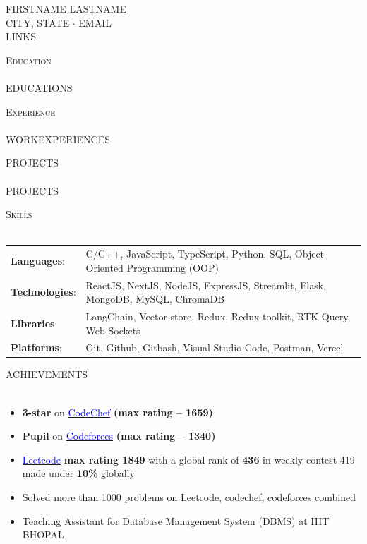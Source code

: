 \documentclass[a4paper]{article}
\newcommand{\lineunder} {
    \vspace*{-8pt} \\
    \hspace*{-18pt} \hrulefill \\
}
\newcommand{\header} [1] {
    {\hspace*{-18pt}\vspace*{6pt} \textsc{#1}}
    \vspace*{-6pt} \lineunder
}
\begin{document}
\vspace*{-40pt}

    

\vspace*{-15pt}
\begin{center}
	{\Huge \scshape {{FIRSTNAME}} {{LASTNAME}}}\\
	{{CITY}}, {{STATE}} $\cdot$ {{EMAIL}} \\
	{{LINKS}}
\end{center}

\header{Education}
{{EDUCATIONS}}
\header{Experience}
{{WORKEXPERIENCES}}

\header{PROJECTS}
{{PROJECTS}}




\header{Skills}
\vspace{1mm}
\begin{tabular}{@{} l l @{}}
    \textbf{Languages}:            & C/C++, JavaScript, TypeScript, Python, SQL, Object-Oriented Programming (OOP)  \\[1mm]
    \textbf{Technologies}:         &ReactJS, NextJS, NodeJS, ExpressJS, Streamlit, Flask, MongoDB, MySQL, ChromaDB \\[1mm]
    \textbf{Libraries}:            & LangChain, Vector-store, Redux, Redux-toolkit, RTK-Query, Web-Sockets\\[1mm]
    \textbf{Platforms}:            & Git, Github, Gitbash, Visual Studio Code, Postman, Vercel \\
\end{tabular}




\vspace{2mm}
\vspace{1mm}

\header{ACHIEVEMENTS}
\begin{itemize}[leftmargin=*, itemsep=0pt, topsep=0pt] %
    \item \textbf{3-star} on \href{https://www.codechef.com/users/neat_tiger_70}{\textcolor{blue}{CodeChef}} \textbf{(max rating – 1659)}
    \item \textbf{Pupil} on \href{https://codeforces.com/profile/narutouzumaki16092003}{\textcolor{blue}{Codeforces}} \textbf{(max rating – 1340)}
    \item \href{https://leetcode.com/u/srivastavaaryanalc76/}{\textcolor{blue}{Leetcode}} \textbf{max rating 1849} with a global rank of \textbf{436} in weekly contest 419 made under \textbf{10\%} globally
     \item Solved more than 1000 problems on Leetcode, codechef, codeforces combined
    \item Teaching Assistant for Database Management System (DBMS) at IIIT BHOPAL
\end{itemize}


\end{document}
